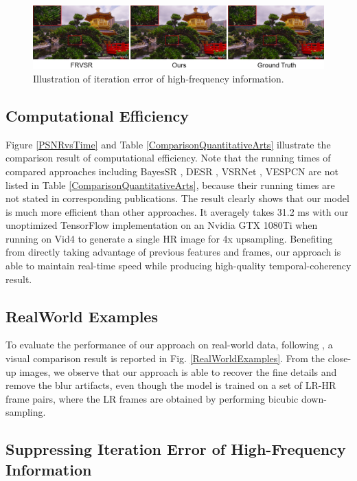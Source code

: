 \documentclass[letterpaper]{article} %
\begin{document}
\begin{figure}[t]
\centering
\includegraphics[width=8.5 cm]{Fig10.png}
\caption{Illustration of iteration error of high-frequency information.}
\label{SuppressingFigure}
\end{figure}



\subsection{Computational Efficiency}


Figure \ref{PSNRvsTime} and Table \ref{ComparisonQuantitativeArts} illustrate the comparison result of computational efficiency. Note that the running times of compared approaches including BayesSR \cite{BayesSR2011cvpr}, DESR \cite{DESR2015iccv}, VSRNet \cite{VSRNet2016TCT}, VESPCN \cite{VESPCN2017cvpr} are not listed in Table \ref{ComparisonQuantitativeArts}, because their running times are not stated in corresponding publications. The result clearly shows that our model is much more efficient than other approaches. It averagely takes 31.2 ms with our unoptimized TensorFlow implementation on an Nvidia GTX 1080Ti when running on Vid4 to generate a single HR image for 4x upsampling. Benefiting from directly taking advantage of previous features and frames, our approach is able to maintain real-time speed while producing high-quality temporal-coherency result.


\subsection{RealWorld Examples}


To evaluate the performance of our approach on real-world data, following \cite{VESPCN2017cvpr}, a visual comparison result is reported in Fig. \ref{RealWorldExamples}. From the close-up images, we observe that our approach is able to recover the fine details and remove the blur artifacts, even though the model is trained on a set of LR-HR frame pairs, where the LR frames are obtained by performing bicubic down-sampling.



\subsection{Suppressing Iteration Error of High-Frequency Information}
\end{document}
